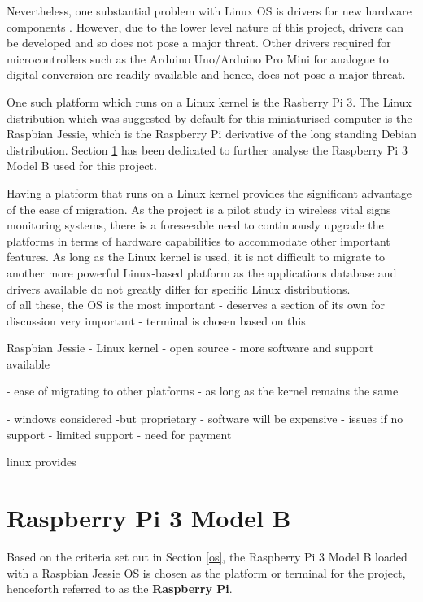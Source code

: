 Nevertheless, one substantial problem with Linux OS is drivers for new hardware components \cite{linuxadvantagedisadvantage}. However, due to the lower level nature of this project, drivers can be developed and so does not pose a major threat. Other drivers required for microcontrollers such as the Arduino Uno/Arduino Pro Mini for analogue to digital conversion are readily available and hence, does not pose a major threat.  

One such platform which runs on a Linux kernel is the Rasberry Pi 3. The Linux distribution which was suggested by default for this miniaturised computer is the Raspbian Jessie, which is the Raspberry Pi derivative of the long standing Debian distribution. Section \ref{rpi} has been dedicated to further analyse the Raspberry Pi 3 Model B used for this project. 

Having a platform that runs on a Linux kernel provides the significant advantage of the ease of migration. As the project is a pilot study in wireless vital signs monitoring systems, there is a foreseeable need to continuously upgrade the platforms in terms of hardware capabilities to accommodate other important features. As long as the Linux kernel is used, it is not difficult to migrate to another more powerful Linux-based platform as the applications database and drivers available do not greatly differ for specific Linux distributions. \\


of all these, the OS is the most important - deserves a section of its own for discussion
very important - terminal is chosen based on this

Raspbian Jessie - Linux kernel - open source - more software and support available 

- ease of migrating to other platforms - as long as the kernel remains the same 

- windows considered -but proprietary - software will be expensive - issues if no support - limited support - need for payment

linux provides 
\cite{linuxwindows}

\section{Raspberry Pi 3 Model B}
\label{rpi}

Based on the criteria set out in Section \ref{os}, the Raspberry Pi 3 Model B loaded with a Raspbian Jessie OS is chosen as the platform or terminal for the project, henceforth referred to as the \textbf{Raspberry Pi}.

